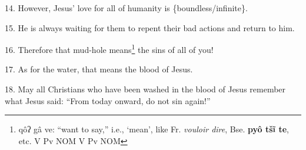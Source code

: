 14. However, Jesus' love for all of humanity is \{boundless/infinite\}.

15. He is always waiting for them to repent their bad actions and return to him.

16. Therefore that mud-hole means\footnote{qôʔ gâ ve: ``want to say,'' i.e., `mean', like Fr. \textit{vouloir dire}, Bse. \textbf{pyô tšĩ te}, etc.  V   Pv  NOM                 V    Pv  NOM} the sins of all of you!

17. As for the water, that means the blood of Jesus.

18. May all Christians who have been washed in the blood of Jesus remember what
Jesus said: ``From today onward, do not sin again!''


